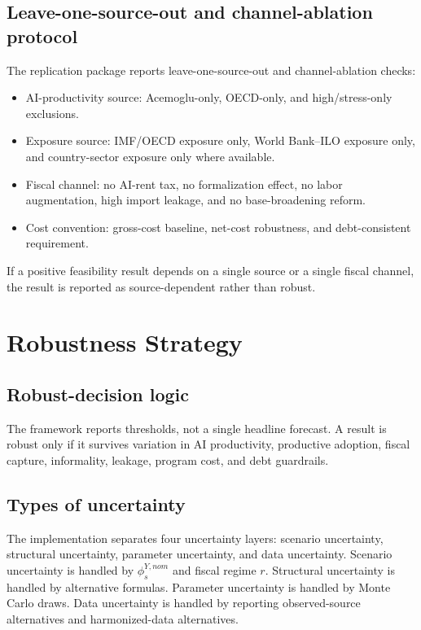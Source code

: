 \documentclass[11pt,a4paper]{article}
\begin{document}
\subsection{Leave-one-source-out and channel-ablation protocol}

The replication package reports leave-one-source-out and channel-ablation checks:
\begin{itemize}
    \item AI-productivity source: Acemoglu-only, OECD-only, and high/stress-only exclusions.
    \item Exposure source: IMF/OECD exposure only, World Bank--ILO exposure only, and country-sector exposure only where available.
    \item Fiscal channel: no AI-rent tax, no formalization effect, no labor augmentation, high import leakage, and no base-broadening reform.
    \item Cost convention: gross-cost baseline, net-cost robustness, and debt-consistent requirement.
\end{itemize}
If a positive feasibility result depends on a single source or a single fiscal channel, the result is reported as source-dependent rather than robust.


\section{Robustness Strategy}\label{sec:robustness}

\subsection{Robust-decision logic}

The framework reports thresholds, not a single headline forecast. A result is robust only if it survives variation in AI productivity, productive adoption, fiscal capture, informality, leakage, program cost, and debt guardrails.

\subsection{Types of uncertainty}

The implementation separates four uncertainty layers: scenario uncertainty, structural uncertainty, parameter uncertainty, and data uncertainty. Scenario uncertainty is handled by $\phi^{Y,nom}_s$ and fiscal regime $r$. Structural uncertainty is handled by alternative formulas. Parameter uncertainty is handled by Monte Carlo draws. Data uncertainty is handled by reporting observed-source alternatives and harmonized-data alternatives.
\end{document}
